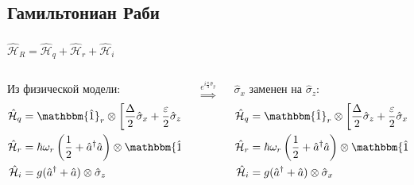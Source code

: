 \documentclass[aspectratio=169, 13pt]{beamer}
\begin{document}
\subsection*{Гамильтониан Раби}
\begin{frame}[noframenumbering, c]\frametitle{\secname}\framesubtitle{\subsecname}

\centering
$\mathcal{\hat H}_R = \hat{\mathcal{H}}_{q}+\hat{\mathcal{H}}_{r}+\hat{\mathcal{H}}_{i}$
\vspace{1cm}
\begin{columns}[c]
	\begin{column}{.45\textwidth}
	\hspace{1cm}Из физической модели:
	\begin{align*}
	\hat{\mathcal{H}}_{q} &= \mathbbm{\hat 1}_r \otimes \left[\frac{\Delta}{2} \hat \sigma_x + 				\frac{\varepsilon}{2} \hat \sigma_z \right]\\
	\hat{\mathcal{H}}_{r} &= \hbar \omega_r \left(\frac{1}{2}+\hat a^\dag \hat a \right) \otimes \mathbbm{\hat 1}_q\\
	\hat{\mathcal{H}}_i &= g (\hat a^\dag + \hat a) \otimes \hat \sigma_z
	\end{align*}
	\end{column}

	\begin{column}{0.1\textwidth}
	{\huge $\overset{e^{i\frac{\pi}{4}\hat \sigma_y}}{\Rightarrow}$}
	\end{column}
	\begin{column}{.45\textwidth}
	\hspace{1.5cm}$\hat \sigma_x$ заменен на $\hat \sigma_z$:
	\begin{align*}
	\hat{\mathcal{H}}_{q} &= \mathbbm{\hat 1}_r \otimes \left[\frac{\Delta}{2} \hat \sigma_z + 				\frac{\varepsilon}{2} \hat \sigma_x \right]\\
	\hat{\mathcal{H}}_{r} &= \hbar \omega_r \left(\frac{1}{2}+\hat a^\dag \hat a \right) \otimes \mathbbm{\hat 1}_q\\
	\hat{\mathcal{H}}_i &= g (\hat a^\dag + \hat a) \otimes \hat \sigma_x
	\end{align*}
	\end{column}

\end{columns}
\end{frame}
\end{document}
